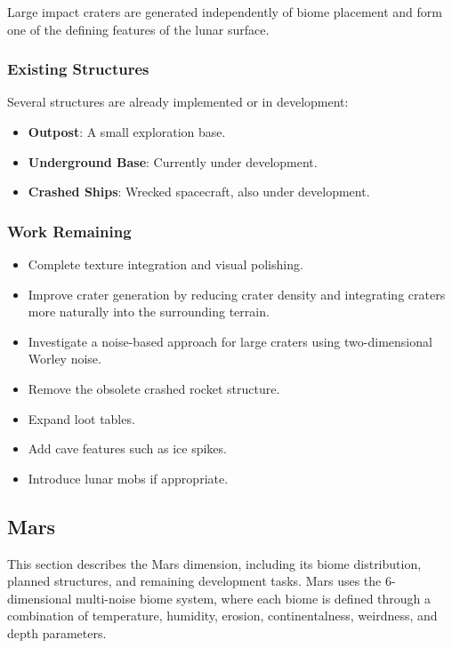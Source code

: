 \documentclass{article}
\begin{document}
Large impact craters are generated independently of biome placement and form one of the defining features of the lunar surface.

\subsubsection{Existing Structures}

Several structures are already implemented or in development:

\begin{itemize}
    \item \textbf{Outpost}: A small exploration base.
    \item \textbf{Underground Base}: Currently under development.
    \item \textbf{Crashed Ships}: Wrecked spacecraft, also under development.
\end{itemize}

\subsubsection{Work Remaining}

\begin{itemize}
    \item Complete texture integration and visual polishing.
    \item Improve crater generation by reducing crater density and integrating craters more naturally into the surrounding terrain.
    \item Investigate a noise-based approach for large craters using two-dimensional Worley noise.
    \item Remove the obsolete crashed rocket structure.
    \item Expand loot tables.
    \item Add cave features such as ice spikes.
    \item Introduce lunar mobs if appropriate.
\end{itemize}


\subsection{Mars}

This section describes the Mars dimension, including its biome distribution, planned structures, and remaining development tasks. Mars uses the 6-dimensional multi-noise biome system, where each biome is defined through a combination of temperature, humidity, erosion, continentalness, weirdness, and depth parameters.
\end{document}
